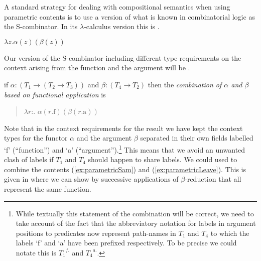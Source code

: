 A standard strategy for dealing with compositional semantics when
using parametric contents is to use a version of what is known in
combinatorial logic as the S-combinator.  In its $\lambda$-calculus
version this is \nexteg{}.
\begin{ex} 
$\lambda z. \alpha(z)(\beta(z))$ 
\end{ex} 
Our version of the S-combinator including different type requirements
on the context arising from the function and the argument will be
\nexteg{}.
\begin{ex} 
if $\alpha : (T_1 \rightarrow (T_2 \rightarrow T_3))$ and 
\hspace*{1em}$\beta
  : (T_4\rightarrow T_2)$ then the \textit{combination of $\alpha$ and
    $\beta$  based on functional application} is 
\begin{quote}
$\lambda r$:. $\alpha(r.\textrm{f})(\beta(r.\textrm{a}))$
\end{quote} 
\end{ex} 
Note that in the context requirements for the result we have kept the
context types for the functor $\alpha$ and the argument $\beta$
separated in their own fields labelled `f' (``function'') and `a'
(``argument'').\footnote{While textually this statement of the combination
  will be correct, we need to take account of the fact that the
  abbreviatory notation for labels in argument positions to predicates
  now represent path-names in $T_1$ and $T_4$ to which the labels `f'
  and `a' have been prefixed respectively.  To be precise we could
  notate this is ${T_1}^{f.}$ and ${T_4}^{a.}$.}  This means that we avoid an unwanted clash of labels
if $T_1$ and $T_4$ should happen to share labels.  We could used
\preveg{} to combine the contents (\ref{ex:parametricSam}) and
(\ref{ex:parametricLeave}).  This is given in \nexteg{} where we can
show by successive applications of $\beta$-reduction that
 all represent the same function.
